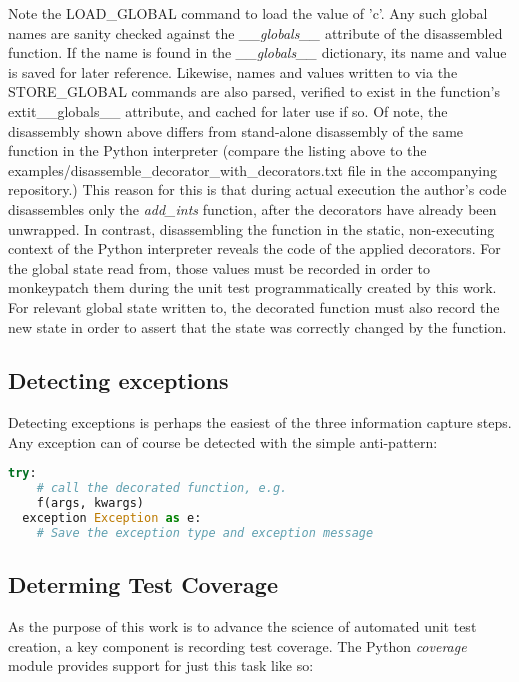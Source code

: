 

Note the LOAD\_GLOBAL command to load the value of 'c'.  Any such global names 
are sanity checked against the \textit{\_\_globals\_\_} attribute of the disassembled function.
%
If the name is found in the \textit{\_\_globals\_\_} dictionary, its name and value is saved for later reference.  Likewise, names and values written to via the STORE\_GLOBAL commands are also parsed, verified to exist in the function's extit{\_\_globals\_\_} attribute, and cached for later use if so.
%
Of note, the disassembly shown above differs from stand-alone disassembly of the same function in the Python interpreter (compare the listing above to the examples/disassemble\_decorator\_with\_decorators.txt file in the accompanying repository.)
This reason for this is that during actual execution the author's code disassembles only the \textit{add\_ints} function, after the decorators have already been unwrapped.
In contrast, disassembling the function in the static, non-executing context of
the Python interpreter reveals the code of the applied decorators.  
%
For the global state read from, those values must be recorded 
in order to monkeypatch them during the unit test programmatically 
created by this work.
%
For relevant global state written to, the decorated function must also record
the new state in order to assert that the state was correctly changed by the function.

\subsection{Detecting exceptions}\label{sec:approach-internal-3}
Detecting exceptions is perhaps the easiest of the three information capture steps.
Any exception can of course be detected with the simple anti-pattern:
\newpage
\begin{lstlisting}[language=Python]
  try:
    # call the decorated function, e.g.
    f(args, kwargs)
  exception Exception as e:
    # Save the exception type and exception message
  \end{lstlisting}

\subsection{Determing Test Coverage}\label{sec:approach-internal-4}
As the purpose of this work is to advance the science of automated unit test 
creation, a key component is recording test coverage.  The Python \textit{coverage}
module provides support for just this task like so:

